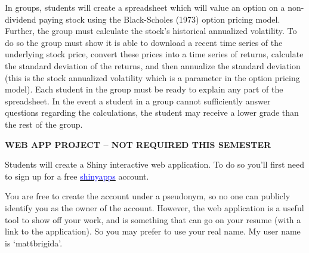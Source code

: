 \documentclass{article}
\begin{document}
In groups, students will create a spreadsheet which will value an option on a non-dividend
paying stock using the Black-Scholes (1973) option pricing model. Further, the group must calculate
the stock's historical annualized volatility. To do so the group must show it is able to download a recent
time series of the underlying stock price, convert these prices into a time series of returns, calculate the
standard deviation of the returns, and then annualize the standard deviation (this is the stock annualized
volatility which is a parameter in the option pricing model). Each student in the group must be ready to
explain any part of the spreadsheet. In the event a student in a group cannot sufficiently answer
questions regarding the calculations, the student may receive a lower grade than the rest of the group. 
\vspace*{5pt}
\begin{center}
{\bf WEB APP PROJECT -- NOT REQUIRED THIS SEMESTER}
\end{center}
Students will create a Shiny interactive web application.  To do so you'll first need to sign up for a free \href{https://www.shinyapps.io/}{\textcolor{blue}{shinyapps}} account.  

You are free to create the account under a pseudonym, so no one can publicly identify you as the owner of the account.  However, the web application is a useful tool to show off your work, and is something that can go on your resume (with a link to the application).  So you may prefer to use your real name.  My user name is `mattbrigida'.  
\end{document}
